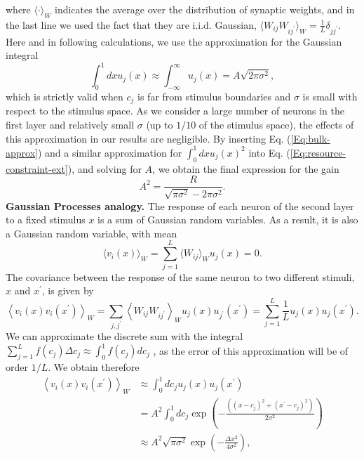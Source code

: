\documentclass[a4paper]{article}%
\begin{document}
where $\langle\cdot\rangle_{W}$ indicates the average over the distribution of
synaptic weights, and in the last line we used the fact that they are i.i.d.
Gaussian, $\langle W_{ij}W_{ij^{\prime}}\rangle_{W} = \frac{1}{L}%
\delta_{jj^{\prime}}$. Here and in following calculations, we use the
approximation for the Gaussian integral
\begin{equation}
\int_{0}^{1} dx u_{j}(x) \approx\int_{-\infty}^{\infty} u_{j}(x) = A
\sqrt{2\pi\sigma^{2}}, \label{Eq:bulk-approx}%
\end{equation}
which is strictly valid when $c_{j}$ is far from stimulus boundaries and
$\sigma$ is small with respect to the stimulus space. As we consider a large
number of neurons in the first layer and relatively small $\sigma$ (up to
$1/10$ of the stimulus space), the effects of this approximation in our
results are negligible. By inserting Eq. (\ref{Eq:bulk-approx}) and a similar
approximation for $\int_{0}^{1} dx u_{j}(x)^{2}$ into Eq.
(\ref{Eq:resource-constraint-ext}), and solving for $A$, we obtain the final
expression for the gain
\begin{equation}
A^{2} = \frac{R}{\sqrt{\pi\sigma^{2}} - 2\pi\sigma^{2}}.
\end{equation}
\newline\newline\textbf{Gaussian Processes analogy.} The response of each
neuron of the second layer to a fixed stimulus $x$ is a sum of Gaussian random
variables. As a result, it is also a Gaussian random variable, with mean
\begin{equation}
\langle v_{i}(x) \rangle_{W} = \sum_{j=1}^{L} \langle W_{ij}\rangle_{W}
u_{j}(x) = 0. \label{Eq:GP-mean}%
\end{equation}
The covariance between the response of the same neuron to two different
stimuli, $x$ and $x^{\prime}$, is given by
\begin{equation}
\left\langle v_{i}(x)v_{i}(x^{\prime}) \right\rangle _{W} = \sum_{j,j^{\prime
}} \left\langle W_{ij}W_{ij^{\prime}} \right\rangle _{W} u_{j}(x)
u_{j^{\prime}}(x^{\prime}) = \sum_{j=1}^{L} \frac{1}{L} u_{j}(x)
u_{j}(x^{\prime}).
\end{equation}
We can approximate the discrete sum with the integral $\sum_{j=1}^{L} f(c_{j})
\Delta c_{j} \approx\int_{0}^{1} f(c_{j}) dc_{j}$ , as the error of this
approximation will be of order $1/L$. We obtain therefore
\begin{equation}%
\begin{split}
\left\langle v_{i}(x)v_{i}(x^{\prime}) \right\rangle _{W}  &  \approx\int%
_{0}^{1} dc_{j} u_{j}(x)u_{j}(x^{\prime})\\
&  = A^{2} \int_{0}^{1} dc_{j} \exp\left(  -\frac{\left(  \left(
x-c_{j}\right)  ^{2} + \left(  x^{\prime}-c_{j}\right)  ^{2}\right)  }%
{2\sigma^{2}}\right) \\
&  \approx A^{2} \sqrt{\pi\sigma^{2}}\exp\left(  -\frac{\Delta x^{2}}%
{4\sigma^{2}}\right)  ,\label{Eq:GP-cov}%
\end{split}
\end{equation}
\end{document}
